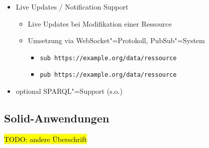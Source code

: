 \begin{itemize}
    \item Live Updates / Notification Support
    \begin{itemize}
        \item Live Updates bei Modifikation einer Ressource~\cite{sambraSolidPlatformDecentralized2016}
        \item Umsetzung via WebSocket"=Protokoll, PubSub"=System~\cite{sambraSolidPlatformDecentralized2016}
        \begin{itemize}
            \item \verb|sub https://example.org/data/ressource|
            \item \verb|pub https://example.org/data/ressource|
        \end{itemize}
    \end{itemize}

    \item optional SPARQL"=Support (s.o.)~\cite{sambraSolidPlatformDecentralized2016}
\end{itemize}


\subsection{Solid-Anwendungen}
\hl{TODO: andere Überschrift}


